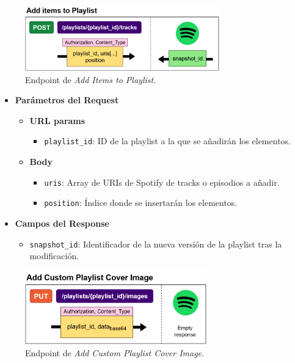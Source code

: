 \newpage

\begin{figure}[H]
    \centering
    \includegraphics[width=0.75\textwidth]{figures/endpoints/add_items_to_playlist.png}
    \caption{Endpoint de \textit{Add Items to Playlist}.}
    \label{fig:add_items_playlist}
\end{figure}

\begin{itemize}
    \item \textbf{Parámetros del Request}
          \begin{itemize}
              \item \textbf{URL params}
                    \begin{itemize}
                        \item \texttt{playlist\_id}: ID de la playlist a la que se añadirán los elementos.
                    \end{itemize}
              \item \textbf{Body}
                    \begin{itemize}
                        \item \texttt{uris}: Array de URIs de Spotify de tracks o episodios a añadir.
                        \item \texttt{position}: Índice donde se insertarán los elementos.
                    \end{itemize}
          \end{itemize}
    \item \textbf{Campos del Response}
          \begin{itemize}
              \item \texttt{snapshot\_id}: Identificador de la nueva versión de la playlist tras la modificación.
          \end{itemize}
\end{itemize}

\begin{figure}[H]
    \centering
    \includegraphics[width=0.7\textwidth]{figures/endpoints/add_custom_playlist_cover_image.png}
    \caption{Endpoint de \textit{Add Custom Playlist Cover Image}.}
    \label{fig:add_custom_playlist_cover_img}
\end{figure}

